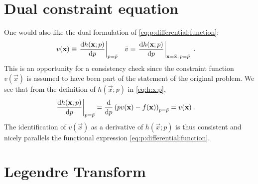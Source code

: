 
\section{Dual constraint equation}
One would also like the dual formulation of \eqref{eq:p:differential:function}:
\begin{align}
    v(\mathbf{x}) &\equiv 
    \left.\frac{\operatorname{d}\mkern-3mu^{}\mkern-1mu{h}(\mathbf{x}; p)}{\operatorname{d}\mkern-3mu^{}\mkern-1mu{p}}\right|_{p = \bar p} 
    &
    \bar v & = 
    \left.\frac{\operatorname{d}\mkern-3mu^{}\mkern-1mu{h}(\mathbf{x}; p)}{\operatorname{d}\mkern-3mu^{}\mkern-1mu{p}}\right|_{\mathbf{x}=\bar{\mathbf{x}}, \, p = \bar p} 
    \ .
    \label{eq:v:differential:function}
\end{align}
This is an opportunity for a consistency check since the constraint function $v(\vec{x})$ is assumed to have been part of the statement of the original problem. We see that from the definition of $h(\vec{x};p)$ in \eqref{eq:h:x:p}, 
\begin{align}
    \left. \frac{ \operatorname{d}\mkern-3mu^{}\mkern-1mu{h}( \mathbf{x}; p ) }{ \operatorname{d}\mkern-3mu^{}\mkern-1mu{p} } \right|_{p = \bar p} 
    &= 
    \frac{ \operatorname{d}\mkern-3mu^{}\mkern-1mu{} }{ \operatorname{d}\mkern-3mu^{}\mkern-1mu{} p }
    \left(
        pv(\mathbf{x}) - f(\mathbf{x})
    \right)_{p = \bar p} 
    =
    v(\mathbf{x}) \ .
\end{align}
The identification of $v(\vec{x})$ as a derivative of $h(\vec{x};p)$ is thus consistent and nicely parallels the functional expression \eqref{eq:p:differential:function}.  

\section{Legendre Transform}

